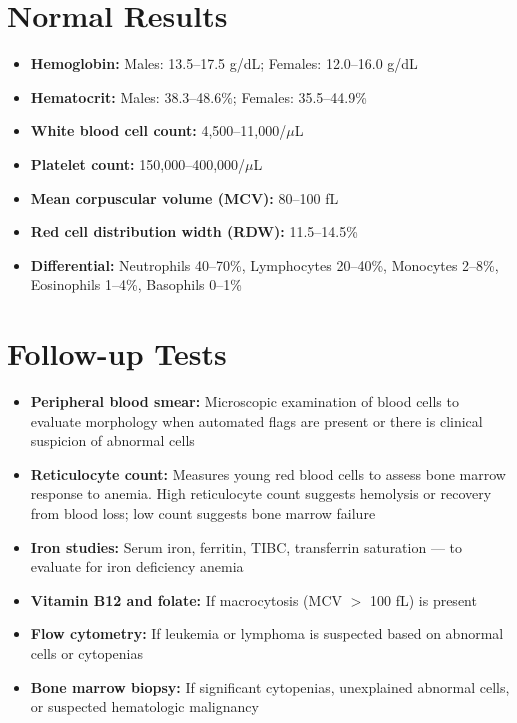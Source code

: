 \section*{Normal Results}
\begin{itemize}
  \item \textbf{Hemoglobin:} Males: 13.5--17.5 g/dL; Females: 12.0--16.0 g/dL
  \item \textbf{Hematocrit:} Males: 38.3--48.6\%; Females: 35.5--44.9\%
  \item \textbf{White blood cell count:} 4,500--11,000/$\mu$L
  \item \textbf{Platelet count:} 150,000--400,000/$\mu$L
  \item \textbf{Mean corpuscular volume (MCV):} 80--100 fL
  \item \textbf{Red cell distribution width (RDW):} 11.5--14.5\%
  \item \textbf{Differential:} Neutrophils 40--70\%, Lymphocytes 20--40\%, Monocytes 2--8\%, Eosinophils 1--4\%, Basophils 0--1\%
\end{itemize}

\section*{Follow-up Tests}
\begin{itemize}
  \item \textbf{Peripheral blood smear:} Microscopic examination of blood cells to evaluate morphology when automated flags are present or there is clinical suspicion of abnormal cells
  \item \textbf{Reticulocyte count:} Measures young red blood cells to assess bone marrow response to anemia. High reticulocyte count suggests hemolysis or recovery from blood loss; low count suggests bone marrow failure
  \item \textbf{Iron studies:} Serum iron, ferritin, TIBC, transferrin saturation --- to evaluate for iron deficiency anemia
  \item \textbf{Vitamin B12 and folate:} If macrocytosis (MCV $>$ 100 fL) is present
  \item \textbf{Flow cytometry:} If leukemia or lymphoma is suspected based on abnormal cells or cytopenias
  \item \textbf{Bone marrow biopsy:} If significant cytopenias, unexplained abnormal cells, or suspected hematologic malignancy
\end{itemize}


